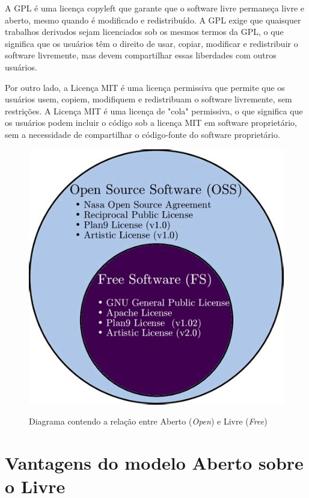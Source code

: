 \documentclass[
	12pt,				%
	oneside,			%
	a4paper,			%
	english,			%
	brazil				%
	]{abntex2ppgsi}
\begin{document}
A GPL é uma licença copyleft que garante que o software livre permaneça livre e aberto, mesmo quando é modificado e redistribuído. A GPL exige que quaisquer trabalhos derivados sejam licenciados sob os mesmos termos da GPL, o que significa que os usuários têm o direito de usar, copiar, modificar e redistribuir o software livremente, mas devem compartilhar essas liberdades com outros usuários.

Por outro lado, a Licença MIT é uma licença permissiva que permite que os usuários usem, copiem, modifiquem e redistribuam o software livremente, sem restrições. A Licença MIT é uma licença de "cola" permissiva, o que significa que os usuários podem incluir o código sob a licença MIT em software proprietário, sem a necessidade de compartilhar o código-fonte do software proprietário.

\begin{figure}[H]%
	\centering
 	  \caption{Diagrama contendo a relação entre Aberto (\emph{Open}) e Livre (\emph{Free})}
		\includegraphics[scale=0.5]{euler.jpg}
	\label{fig:euler}
\end{figure}


\section{Vantagens do modelo Aberto sobre o Livre}
 
\end{document}
